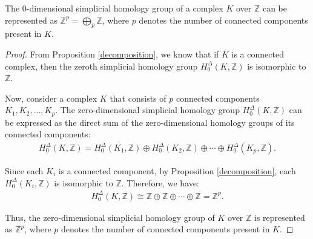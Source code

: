 \begin{corollary}
\label{directsum0hom}
The $0$-dimensional simplicial homology group of a complex \( K \) over \( \mathbb{Z} \) can be represented as \( \mathbb{Z}^{p} = \bigoplus_{p} \mathbb{Z} \), where \( p \) denotes the number of connected components present in \( K \).
\end{corollary}

\begin{proof}
From Proposition \ref{decomposition}, we know that if \( K \) is a connected complex, then the zeroth simplicial homology group \( H^{\Delta}_{0}(K, \mathbb{Z}) \) is isomorphic to \( \mathbb{Z} \).

Now, consider a complex \( K \) that consists of \( p \) connected components \( K_1, K_2, \ldots, K_p \). The zero-dimensional simplicial homology group \( H^{\Delta}_{0}(K, \mathbb{Z}) \) can be expressed as the direct sum of the zero-dimensional homology groups of its connected components:
\begin{align}
H^{\Delta}_{0}(K, \mathbb{Z}) = H^{\Delta}_{0}(K_1, \mathbb{Z}) \oplus H^{\Delta}_{0}(K_2, \mathbb{Z}) \oplus \cdots \oplus H^{\Delta}_{0}(K_p, \mathbb{Z}).
\end{align}

Since each \( K_i \) is a connected component, by Proposition \ref{decomposition}, each \( H^{\Delta}_{0}(K_i, \mathbb{Z}) \) is isomorphic to \( \mathbb{Z} \). Therefore, we have:
\begin{align}
H^{\Delta}_{0}(K, \mathbb{Z}) \cong \mathbb{Z} \oplus \mathbb{Z} \oplus \cdots \oplus \mathbb{Z} = \mathbb{Z}^{p}.
\end{align}

Thus, the zero-dimensional simplicial homology group of \( K \) over \( \mathbb{Z} \) is represented as \( \mathbb{Z}^{p} \), where \( p \) denotes the number of connected components present in \( K \).
\end{proof}

